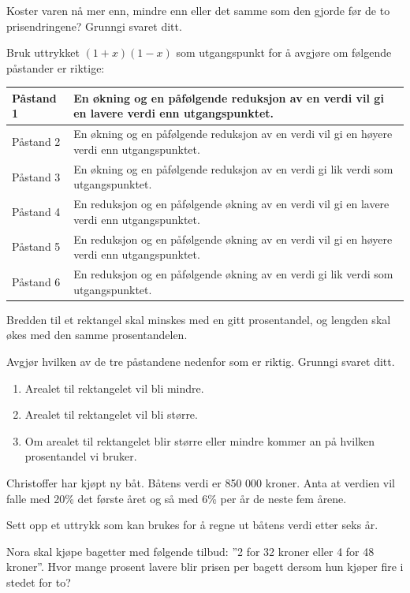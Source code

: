Koster varen nå mer enn, mindre enn eller det samme som den gjorde før de to
prisendringene? Grunngi svaret ditt.

Bruk uttrykket $(1+x)(1-x)$ som utgangspunkt for å avgjøre om følgende påstander er riktige:
\begin{center}
	\small
	\begin{tabular}{p{2cm}|p{8cm}}
		\hline
		Påstand 1 & En økning og en påfølgende reduksjon av en verdi vil gi en lavere verdi enn utgangspunktet. \\ \hline
		Påstand 2 & En økning og en påfølgende reduksjon av en verdi vil gi en høyere verdi enn utgangspunktet. \\ \hline
		Påstand 3 & En økning og en påfølgende reduksjon av en verdi gi lik verdi som utgangspunktet. \\ \hline
		Påstand 4 & En reduksjon og en påfølgende økning av en verdi vil gi en lavere verdi enn utgangspunktet. \\ \hline
		Påstand 5 & En reduksjon og en påfølgende økning av en verdi vil gi en høyere verdi enn utgangspunktet. \\ \hline
		Påstand 6 & En reduksjon og en påfølgende økning av en verdi gi lik verdi som utgangspunktet. \\ \hline
	\end{tabular}
\end{center}

Bredden til et rektangel skal minskes med en gitt prosentandel, og lengden skal økes med den
samme prosentandelen. \os

Avgjør hvilken av de tre påstandene nedenfor som er riktig. Grunngi svaret ditt.
\begin{enumerate}
	\item Arealet til rektangelet vil bli mindre.
	\item Arealet til rektangelet vil bli større.
	\item Om arealet til rektangelet blir større eller mindre kommer
	an på hvilken prosentandel vi bruker.
\end{enumerate}

Christoffer har kjøpt ny båt. Båtens verdi er 850 000 kroner. Anta at verdien vil falle
med 20\% det første året og så med 6\% per år de neste fem årene. \os

Sett opp et uttrykk som kan brukes for å regne ut båtens verdi etter seks år.

Nora skal kjøpe bagetter med følgende tilbud: ''2 for 32 kroner eller
4 for 48 kroner''. Hvor mange prosent lavere blir prisen per bagett dersom hun kjøper fire
i stedet for to?

